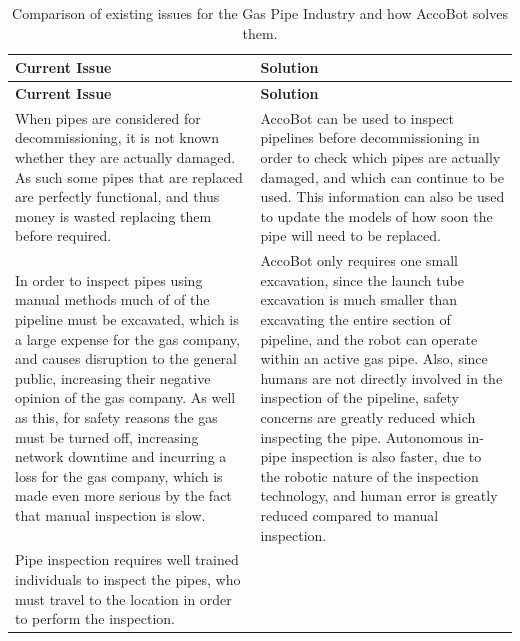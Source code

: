\documentclass[11pt]{article}		%
\begin{document}
		\setlength{\tabcolsep}{13pt}	%
		\renewcommand{\arraystretch}{1.4}	%
		
		
		\begin{longtable}[c]{| m{} | m{} |}
		
			\hline
			\rowcolor{headerBlue} \textbf{Current Issue} & \textbf{Solution}\\
			\hline
			\endfirsthead

			\hline
			\rowcolor{headerBlue} \textbf{Current Issue} & \textbf{Solution}\\
			\hline
			\endhead
			
			\hline
			\caption{Comparison of existing issues for the Gas Pipe Industry and how AccoBot solves them.}
			\endlastfoot
			
			\hline
			\rowcolor{rowGrey}
			When pipes are considered for decommissioning, it is not known whether they are actually damaged. 
			As such some pipes that are replaced are perfectly functional, and thus money is wasted replacing them before required. 
			& 
			AccoBot can be used to inspect pipelines before decommissioning in order to check which pipes are actually damaged, and which can continue to be used. 
			This information can also be used to update the models of how soon the pipe will need to be replaced.
			\\
			\hline
			\rowcolor{rowGrey}
			In order to inspect pipes using manual methods much of of the pipeline must be excavated, which is a large expense for the gas company, and causes disruption to the general public, increasing their negative opinion of the gas company.
			As well as this, for safety reasons the gas must be turned off, increasing network downtime and incurring a loss for the gas company, which is made even more serious by the fact that manual inspection is slow.
			& 
			AccoBot only requires one small excavation, since the launch tube excavation is much smaller than excavating the entire section of pipeline, and the robot can operate within an active gas pipe.
			Also, since humans are not directly involved in the inspection of the pipeline, safety concerns are greatly reduced which inspecting the pipe.
			Autonomous in-pipe inspection is also faster, due to the robotic nature of the inspection technology, and human error is greatly reduced compared to manual inspection.
			\\
			\hline
			\rowcolor{rowGrey}
			Pipe inspection requires well trained individuals to inspect the pipes, who must travel to the location in order to perform the inspection.
			

\end{longtable}
\end{document}
